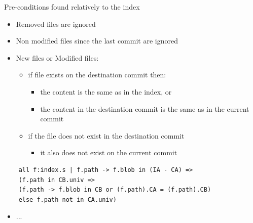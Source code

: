 \documentclass{beamer}
\begin{document}
\begin{frame}
   \begin{block}{Pre-conditions found relatively to the index}
      \begin{itemize}
         \item Removed files are ignored
         \item Non modified files since the last commit are ignored
         \item New files or Modified files:
            \begin{itemize}
               \item if file exists on the destination commit then:
                  \begin{itemize}
                     \item the content is the same as in the index, or
                     \item the content in 
		     the destination commit is the same as in the current commit
                  \end{itemize}
               \item if the file does not exist in the destination commit
                  \begin{itemize}
                     \item it also does not exist on the current commit
                  \end{itemize}
            \end{itemize}
      \end{itemize}
   \end{block}
\end{frame}

\begin{frame}[fragile]
	\scriptsize
	\begin{lstlisting}	
	all f:index.s | f.path -> f.blob in (IA - CA) => 
	(f.path in CB.univ => 
	(f.path -> f.blob in CB or (f.path).CA = (f.path).CB)
	else f.path not in CA.univ)
	\end{lstlisting}
	\normalsize
	\begin{itemize}
	\item ... 
	\end{itemize}

\end{frame}
\end{document}
